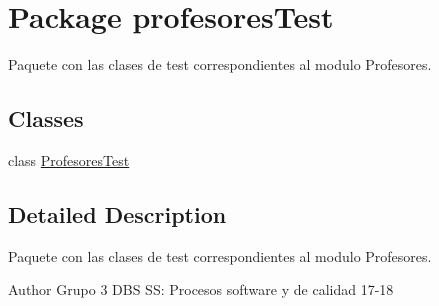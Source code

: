 \hypertarget{namespaceprofesores_test}{}\section{Package profesores\+Test}
\label{namespaceprofesores_test}


Paquete con las clases de test correspondientes al modulo Profesores.  


\subsection*{Classes}
\begin{DoxyCompactItemize}
\item 
class \hyperlink{classprofesores_test_1_1_profesores_test}{Profesores\+Test}
\end{DoxyCompactItemize}


\subsection{Detailed Description}
Paquete con las clases de test correspondientes al modulo Profesores. 

\begin{DoxyAuthor}{Author}
Grupo 3 D\+BS SS\+: Procesos software y de calidad 17-\/18 
\end{DoxyAuthor}
